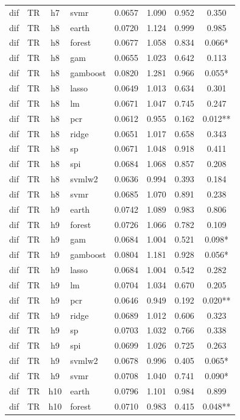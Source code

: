 \begin{ThreePartTable}
\begin{longtable}[t]{llclcccc}
dif & TR & h7 & svmr & 0.0657 & 1.090 & 0.952 & 0.350\\
\addlinespace
dif & TR & h8 & earth & 0.0720 & 1.124 & 0.999 & 0.985\\
dif & TR & h8 & forest & 0.0677 & 1.058 & 0.834 & 0.066*\\
dif & TR & h8 & gam & 0.0655 & 1.023 & 0.642 & 0.113\\
dif & TR & h8 & gamboost & 0.0820 & 1.281 & 0.966 & 0.055*\\
dif & TR & h8 & lasso & 0.0649 & 1.013 & 0.634 & 0.301\\
dif & TR & h8 & lm & 0.0671 & 1.047 & 0.745 & 0.247\\
dif & TR & h8 & pcr & 0.0612 & 0.955 & 0.162 & 0.012**\\
dif & TR & h8 & ridge & 0.0651 & 1.017 & 0.658 & 0.343\\
dif & TR & h8 & sp & 0.0671 & 1.048 & 0.918 & 0.411\\
dif & TR & h8 & spi & 0.0684 & 1.068 & 0.857 & 0.208\\
dif & TR & h8 & svmlw2 & 0.0636 & 0.994 & 0.393 & 0.184\\
dif & TR & h8 & svmr & 0.0685 & 1.070 & 0.891 & 0.238\\
\addlinespace
dif & TR & h9 & earth & 0.0742 & 1.089 & 0.983 & 0.806\\
dif & TR & h9 & forest & 0.0726 & 1.066 & 0.782 & 0.109\\
dif & TR & h9 & gam & 0.0684 & 1.004 & 0.521 & 0.098*\\
dif & TR & h9 & gamboost & 0.0804 & 1.181 & 0.928 & 0.056*\\
dif & TR & h9 & lasso & 0.0684 & 1.004 & 0.542 & 0.282\\
dif & TR & h9 & lm & 0.0704 & 1.034 & 0.670 & 0.205\\
dif & TR & h9 & pcr & 0.0646 & 0.949 & 0.192 & 0.020**\\
dif & TR & h9 & ridge & 0.0689 & 1.012 & 0.606 & 0.323\\
dif & TR & h9 & sp & 0.0703 & 1.032 & 0.766 & 0.338\\
dif & TR & h9 & spi & 0.0699 & 1.026 & 0.725 & 0.263\\
dif & TR & h9 & svmlw2 & 0.0678 & 0.996 & 0.405 & 0.065*\\
dif & TR & h9 & svmr & 0.0708 & 1.040 & 0.741 & 0.090*\\
\addlinespace
dif & TR & h10 & earth & 0.0796 & 1.101 & 0.984 & 0.899\\
dif & TR & h10 & forest & 0.0710 & 0.983 & 0.415 & 0.048**\\

\end{longtable}
\end{ThreePartTable}

